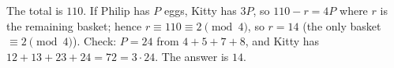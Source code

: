 The total is $110$. If Philip has $P$ eggs, Kitty has $3P$, so $110-r=4P$ where $r$ is the remaining basket; hence $r\equiv110\equiv2\pmod4$, so $r=14$ (the only basket $\equiv2\pmod4$). Check: $P=24$ from $4+5+7+8$, and Kitty has $12+13+23+24=72=3\cdot24$. The answer is $\boxed{14}$.
